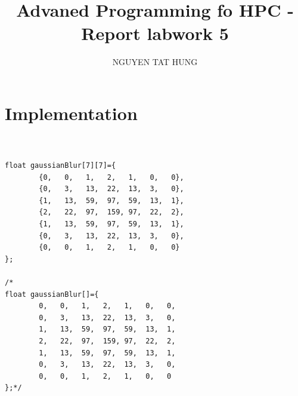 \documentclass{article}
\title{Advaned Programming fo HPC - Report labwork 5}
\author{NGUYEN TAT HUNG}
\begin{document}
\maketitle

\section*{Implementation}
\begin{lstlisting}


float gaussianBlur[7][7]={
        {0,   0,   1,   2,   1,   0,   0},
        {0,   3,   13,  22,  13,  3,   0},
        {1,   13,  59,  97,  59,  13,  1},
        {2,   22,  97,  159, 97,  22,  2},
        {1,   13,  59,  97,  59,  13,  1},
        {0,   3,   13,  22,  13,  3,   0},
        {0,   0,   1,   2,   1,   0,   0}
};

/*
float gaussianBlur[]={
        0,   0,   1,   2,   1,   0,   0,
        0,   3,   13,  22,  13,  3,   0,
        1,   13,  59,  97,  59,  13,  1,
        2,   22,  97,  159, 97,  22,  2,
        1,   13,  59,  97,  59,  13,  1,
        0,   3,   13,  22,  13,  3,   0,
        0,   0,   1,   2,   1,   0,   0
};*/


\end{lstlisting}
\end{document}
